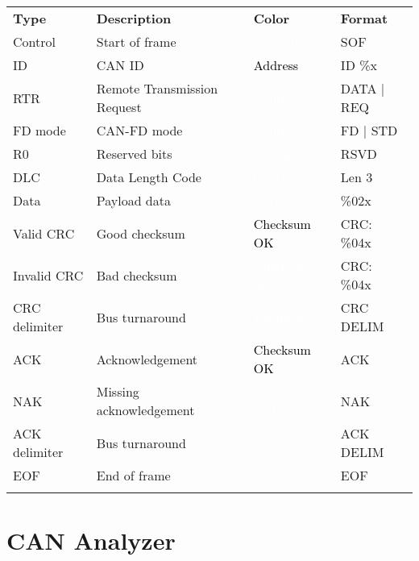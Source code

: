 \begin{tabularx}{16cm}{lllX}
\thickhline
\textbf{Type} & \textbf{Description} & \textbf{Color} & \textbf{Format} \\
\thickhline
Control & Start of frame & \cellcolor{preamble}\textcolor{white}{Preamble} & SOF \\
\thinhline
ID & CAN ID & \cellcolor{address}\textcolor{black}{Address} & ID \%x \\
\thinhline
RTR & Remote Transmission Request & \cellcolor{control}\textcolor{white}{Control} & DATA | REQ \\
\thinhline
FD mode & CAN-FD mode & \cellcolor{control}\textcolor{white}{Control} & FD | STD\\
\thinhline
R0 & Reserved bits & \cellcolor{preamble}\textcolor{white}{Preamble} & RSVD \\
\thinhline
DLC & Data Length Code & \cellcolor{control}\textcolor{white}{Control} & Len 3 \\
\thinhline
Data & Payload data & \cellcolor{data}\textcolor{white}{Data} & \%02x \\
\thinhline
Valid CRC & Good checksum & \cellcolor{checksumok}\textcolor{black}{Checksum OK} & CRC: \%04x \\
\thinhline
Invalid CRC & Bad checksum & \cellcolor{checksumbad}\textcolor{white}{Checksum Bad} & CRC: \%04x \\
\thinhline
CRC delimiter & Bus turnaround & \cellcolor{preamble}\textcolor{white}{Preamble} & CRC DELIM \\
\thinhline
ACK & Acknowledgement & \cellcolor{checksumok}\textcolor{black}{Checksum OK} & ACK \\
\thinhline
NAK & Missing acknowledgement & \cellcolor{checksumbad}\textcolor{white}{Checksum Bad} & NAK \\
\thinhline
ACK delimiter & Bus turnaround & \cellcolor{preamble}\textcolor{white}{Preamble} & ACK DELIM \\
\thinhline
EOF & End of frame & \cellcolor{preamble}\textcolor{white}{Preamble} & EOF \\

\thickhline
\end{tabularx}

\pagebreak
\section{CAN Analyzer}
\label{filter:cananalyzer}

